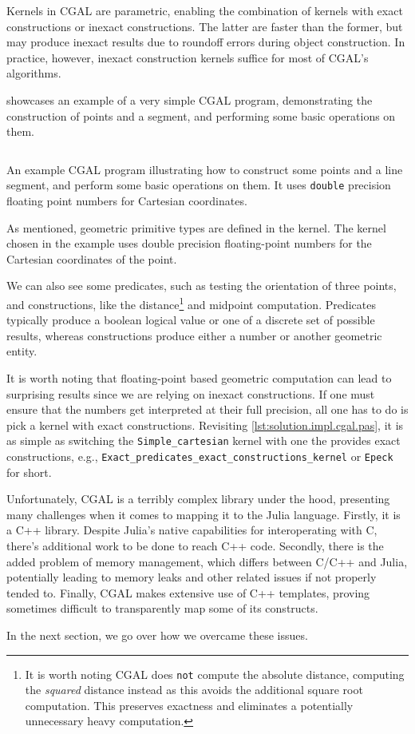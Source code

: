 Kernels in \ac{CGAL} are parametric, enabling the combination of kernels with
exact constructions or inexact constructions.  The latter are faster than the
former, but may produce inexact results due to roundoff errors during object
construction.  In practice, however, inexact construction kernels suffice for
most of \ac{CGAL}'s algorithms.

 showcases an example of a very simple
\ac{CGAL} program, demonstrating the construction of points and a segment, and
performing some basic operations on them.

\begin{listing}[htbp]
  \inputminted{cpp}{cpp/points_and_segments.cpp}
  \caption[CGAL: Three points and one segment]{
    An example CGAL program illustrating how to construct some points and a line
    segment, and perform some basic operations on them.  It uses
    \texttt{double} precision floating point numbers for Cartesian
    coordinates.}\label{lst:solution.impl.cgal.pas}
\end{listing}

As mentioned, geometric primitive types are defined in the kernel.  The kernel
chosen in the example uses double precision floating-point numbers for the
Cartesian coordinates of the point.

We can also see some predicates, such as testing the orientation of three
points, and constructions, like the distance\footnote{It is worth noting
\ac{CGAL} does \texttt{not} compute the absolute distance, computing the
\emph{squared} distance instead as this avoids the additional square root
computation.  This preserves exactness and eliminates a potentially unnecessary
heavy computation.} and midpoint computation.  Predicates typically produce a
boolean logical value or one of a discrete set of possible results, whereas
constructions produce either a number or another geometric entity.

It is worth noting that floating-point based geometric computation can lead to
surprising results since we are relying on inexact constructions.  If one must
ensure that the numbers get interpreted at their full precision, all one has to
do is pick a kernel with exact constructions.  Revisiting
\cref{lst:solution.impl.cgal.pas}, it is as simple as switching the
\texttt{Simple\_cartesian} kernel with one the provides exact constructions,
e.g., \texttt{Exact\_predicates\_exact\_constructions\_kernel} or \texttt{Epeck}
for short.

Unfortunately, \ac{CGAL} is a terribly complex library under the hood,
presenting many challenges when it comes to mapping it to the Julia language.
Firstly, it is a C++ library.  Despite Julia's native capabilities for
interoperating with C, there's additional work to be done to reach C++ code.
Secondly, there is the added problem of memory management, which differs between
C/C++ and Julia, potentially leading to memory leaks and other related issues if
not properly tended to.  Finally, \ac{CGAL} makes extensive use of C++
templates, proving sometimes difficult to transparently map some of its
constructs.

In the next section, we go over how we overcame these issues.
